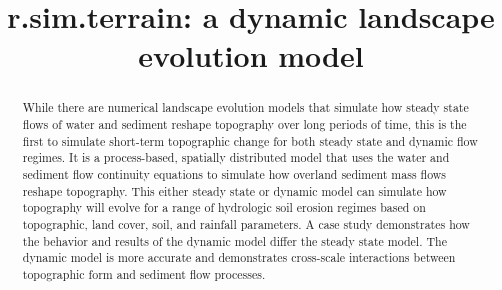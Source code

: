 \documentclass[esurf, manuscript]{copernicus}
\begin{document}
\title{\lowercase{r.sim.terrain}: a dynamic landscape evolution model} %






\received{}
\pubdiscuss{} %
\revised{}
\accepted{}
\published{}


\maketitle

\begin{abstract}
While there are numerical landscape evolution models
that simulate how steady state flows of water and sediment
reshape topography over long periods of time, 
this is the first to simulate short-term topographic change 
for both steady state and dynamic flow regimes. 
It is a process-based, spatially distributed model
that uses the water and sediment flow continuity equations
to simulate how overland sediment mass flows 
reshape topography. 
This either steady state or dynamic model can simulate 
how topography will evolve for a range of hydrologic soil erosion regimes
based on topographic, land cover, soil, and rainfall parameters. 
A case study demonstrates how the behavior and results of 
the dynamic model differ the steady state model. 
The dynamic model is more accurate and 
demonstrates cross-scale interactions between 
topographic form and sediment flow processes.
\end{abstract}


\end{document}
